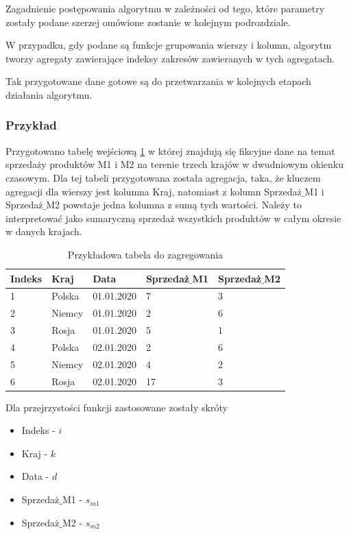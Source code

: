 \documentclass[brudnopis]{xmgr}
\begin{document}
Zagadnienie postępowania algorytmu w zależności od tego, które parametry zostały podane szerzej omówione zostanie w kolejnym podrozdziale.

W przypadku, gdy podane są funkcje grupowania wierszy i kolumn, algorytm tworzy agregaty zawierające indeksy zakresów zawieranych w tych agregatach. 

Tak przygotowane dane gotowe są do przetwarzania w kolejnych etapach działania algorytmu.

\newpage
\subsubsection{Przykład}

Przygotowano tabelę wejściową \ref{tab:example-input} w której znajdują się fikcyjne dane na temat sprzedaży produktów M1 i M2 na terenie trzech krajów w dwudniowym okienku czasowym.
Dla tej tabeli przygotowana została agregacja, taka, że kluczem agregacji dla wierszy jest kolumna Kraj, natomiast z kolumn Sprzedaż$\_$M1 i Sprzedaż$\_$M2 powstaje jedna kolumna z sumą tych wartości.
Należy to interpretować jako sumaryczną sprzedaż wszystkich produktów w całym okresie w danych krajach.

\begin{table}[!tbh]
\begin{tabular}{|l|l|l|l|l|} \hline
Indeks & Kraj & Data & Sprzedaż$\_$M1 & Sprzedaż$\_$M2 \\ \hline
1 & Polska & 01.01.2020 & 7 & 3 \\ \hline
2 & Niemcy & 01.01.2020 & 2 & 6 \\ \hline
3 & Rosja & 01.01.2020 & 5 & 1 \\ \hline
4 & Polska & 02.01.2020 & 2 & 6 \\ \hline
5 & Niemcy & 02.01.2020 & 4 & 2 \\ \hline
6 & Rosja & 02.01.2020 & 17 & 3 \\ \hline
\end{tabular}
\caption{Przykładowa tabela do zagregowania\label{tab:example-input}}
\end{table}

Dla przejrzystości funkcji zastosowane zostały skróty

\begin{itemize}
    \item Indeks - $i$
    \item Kraj - $k$
    \item Data - $d$
    \item Sprzedaż$\_$M1 - $s_{m1}$
    \item Sprzedaż$\_$M2 - $s_{m2}$
\end{itemize}
\end{document}
